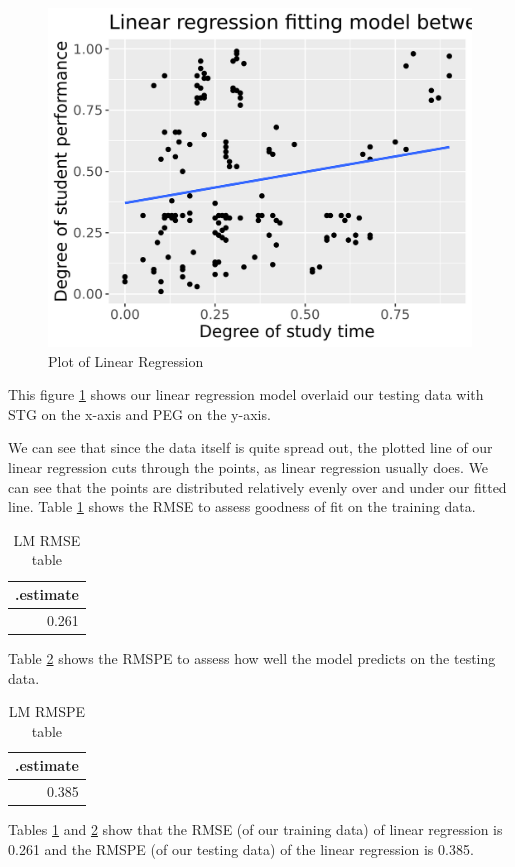 \documentclass[
]{article}
\begin{document}
\begin{figure}
\includegraphics[width=0.5\linewidth]{../results/model/lm_predictions} \caption{Plot of Linear Regression}\label{fig:lm-regression-plot}
\end{figure}

This figure \ref{fig:lm-regression-plot} shows our linear regression model overlaid our testing data with STG on the x-axis and PEG on the y-axis.

We can see that since the data itself is quite spread out, the plotted line of our linear regression cuts through the points, as linear regression usually does. We can see that the points are distributed relatively evenly over and under our fitted line.
Table \ref{tab:lm-rmse-table} shows the RMSE to assess goodness of fit on the training data.

\begin{table}

\caption{\label{tab:lm-rmse-table}LM RMSE table}
\centering
\begin{tabular}[t]{r}
\hline
.estimate\\
\hline
0.261\\
\hline
\end{tabular}
\end{table}

Table \ref{tab:lm-rmspe-table} shows the RMSPE to assess how well the model predicts on the testing data.

\begin{table}

\caption{\label{tab:lm-rmspe-table}LM RMSPE table}
\centering
\begin{tabular}[t]{r}
\hline
.estimate\\
\hline
0.385\\
\hline
\end{tabular}
\end{table}

Tables \ref{tab:lm-rmse-table} and \ref{tab:lm-rmspe-table} show that the RMSE (of our training data) of linear regression is 0.261 and the RMSPE (of our testing data) of the linear regression is 0.385.
\end{document}
